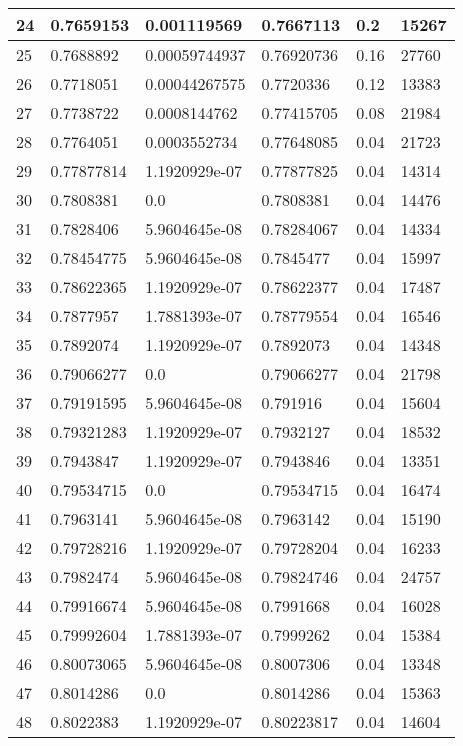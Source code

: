 \begin{longtable}{|l|l|l|l|l|l|}
24 & 0.7659153 & 0.001119569 & 0.7667113 & 0.2 & 15267 \\ \hline 
25 & 0.7688892 & 0.00059744937 & 0.76920736 & 0.16 & 27760 \\ \hline 
26 & 0.7718051 & 0.00044267575 & 0.7720336 & 0.12 & 13383 \\ \hline 
27 & 0.7738722 & 0.0008144762 & 0.77415705 & 0.08 & 21984 \\ \hline 
28 & 0.7764051 & 0.0003552734 & 0.77648085 & 0.04 & 21723 \\ \hline 
29 & 0.77877814 & 1.1920929e-07 & 0.77877825 & 0.04 & 14314 \\ \hline 
30 & 0.7808381 & 0.0 & 0.7808381 & 0.04 & 14476 \\ \hline 
31 & 0.7828406 & 5.9604645e-08 & 0.78284067 & 0.04 & 14334 \\ \hline 
32 & 0.78454775 & 5.9604645e-08 & 0.7845477 & 0.04 & 15997 \\ \hline 
33 & 0.78622365 & 1.1920929e-07 & 0.78622377 & 0.04 & 17487 \\ \hline 
34 & 0.7877957 & 1.7881393e-07 & 0.78779554 & 0.04 & 16546 \\ \hline 
35 & 0.7892074 & 1.1920929e-07 & 0.7892073 & 0.04 & 14348 \\ \hline 
36 & 0.79066277 & 0.0 & 0.79066277 & 0.04 & 21798 \\ \hline 
37 & 0.79191595 & 5.9604645e-08 & 0.791916 & 0.04 & 15604 \\ \hline 
38 & 0.79321283 & 1.1920929e-07 & 0.7932127 & 0.04 & 18532 \\ \hline 
39 & 0.7943847 & 1.1920929e-07 & 0.7943846 & 0.04 & 13351 \\ \hline 
40 & 0.79534715 & 0.0 & 0.79534715 & 0.04 & 16474 \\ \hline 
41 & 0.7963141 & 5.9604645e-08 & 0.7963142 & 0.04 & 15190 \\ \hline 
42 & 0.79728216 & 1.1920929e-07 & 0.79728204 & 0.04 & 16233 \\ \hline 
43 & 0.7982474 & 5.9604645e-08 & 0.79824746 & 0.04 & 24757 \\ \hline 
44 & 0.79916674 & 5.9604645e-08 & 0.7991668 & 0.04 & 16028 \\ \hline 
45 & 0.79992604 & 1.7881393e-07 & 0.7999262 & 0.04 & 15384 \\ \hline 
46 & 0.80073065 & 5.9604645e-08 & 0.8007306 & 0.04 & 13348 \\ \hline 
47 & 0.8014286 & 0.0 & 0.8014286 & 0.04 & 15363 \\ \hline 
48 & 0.8022383 & 1.1920929e-07 & 0.80223817 & 0.04 & 14604 \\ \hline 

\end{longtable}
